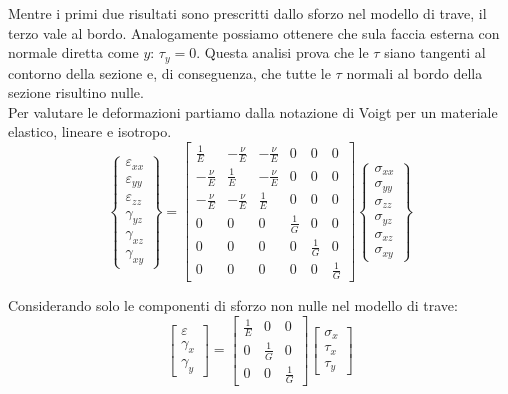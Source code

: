 Mentre i primi due risultati sono prescritti dallo sforzo nel modello di trave, il terzo vale al bordo. Analogamente possiamo ottenere che sula faccia esterna con normale diretta come $y$: $\tau_y = 0$. Questa analisi prova che le $\tau$ siano tangenti al contorno della sezione e, di conseguenza, che tutte le $\tau$ normali al bordo della sezione risultino nulle.\\

Per valutare le deformazioni partiamo dalla notazione di Voigt per un materiale elastico, lineare e isotropo.
\begin{equation*}
\left\{
\begin{array}{c}
\varepsilon_{xx} \\
\varepsilon_{yy} \\
\varepsilon_{zz} \\
\gamma_{yz} \\
\gamma_{xz} \\
\gamma_{xy}
\end{array}
\right\}
=
\left[
\begin{array}{cccccc}
\displaystyle \frac{1}{E} & \displaystyle -\frac{\nu}{E} & \displaystyle -\frac{\nu}{E} & 0 & 0 & 0 \\
\displaystyle -\frac{\nu}{E} & \displaystyle \frac{1}{E} & \displaystyle -\frac{\nu}{E} & 0 & 0 & 0 \\
\displaystyle -\frac{\nu}{E} & \displaystyle -\frac{\nu}{E} & \displaystyle \frac{1}{E} & 0 & 0 & 0 \\
0 & 0 & 0 & \displaystyle \frac{1}{G} & 0 & 0 \\
0 & 0 & 0 & 0 & \displaystyle \frac{1}{G} & 0 \\
0 & 0 & 0 & 0 & 0 & \displaystyle \frac{1}{G}
\end{array}
\right]
\left\{
\begin{array}{c}
\sigma_{xx} \\
\sigma_{yy} \\
\sigma_{zz} \\
\sigma_{yz} \\
\sigma_{xz} \\
\sigma_{xy}
\end{array}
\right\}
\end{equation*}

Considerando solo le componenti di sforzo non nulle nel modello di trave:
\begin{equation*}
    \begin{bmatrix}
\varepsilon \\
\gamma_{x} \\
\gamma_{y}
\end{bmatrix}
=
\begin{bmatrix}
\displaystyle \frac{1}{E} & 0 & 0 \\
0 & \displaystyle \frac{1}{G} & 0 \\
0 & 0 & \displaystyle \frac{1}{G}
\end{bmatrix}
\begin{bmatrix}
\sigma_x \\
\tau_{x} \\
\tau_{y}
\end{bmatrix}
\end{equation*}

